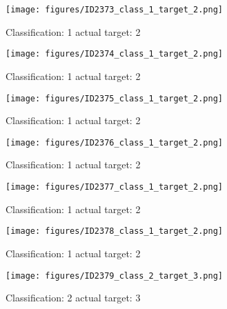 \begin{figure}[h!]
\begin{center}
\texttt{[image: figures/ID2373\_class\_1\_target\_2.png]}
\end{center}
\caption{ Classification: 1 actual target: 2}
\label{fig:ID2373_class_1_target_2}
\end{figure}
\begin{figure}[h!]
\begin{center}
\texttt{[image: figures/ID2374\_class\_1\_target\_2.png]}
\end{center}
\caption{ Classification: 1 actual target: 2}
\label{fig:ID2374_class_1_target_2}
\end{figure}
\begin{figure}[h!]
\begin{center}
\texttt{[image: figures/ID2375\_class\_1\_target\_2.png]}
\end{center}
\caption{ Classification: 1 actual target: 2}
\label{fig:ID2375_class_1_target_2}
\end{figure}
\begin{figure}[h!]
\begin{center}
\texttt{[image: figures/ID2376\_class\_1\_target\_2.png]}
\end{center}
\caption{ Classification: 1 actual target: 2}
\label{fig:ID2376_class_1_target_2}
\end{figure}
\begin{figure}[h!]
\begin{center}
\texttt{[image: figures/ID2377\_class\_1\_target\_2.png]}
\end{center}
\caption{ Classification: 1 actual target: 2}
\label{fig:ID2377_class_1_target_2}
\end{figure}
\begin{figure}[h!]
\begin{center}
\texttt{[image: figures/ID2378\_class\_1\_target\_2.png]}
\end{center}
\caption{ Classification: 1 actual target: 2}
\label{fig:ID2378_class_1_target_2}
\end{figure}
\begin{figure}[h!]
\begin{center}
\texttt{[image: figures/ID2379\_class\_2\_target\_3.png]}
\end{center}
\caption{ Classification: 2 actual target: 3}
\label{fig:ID2379_class_2_target_3}
\end{figure}
